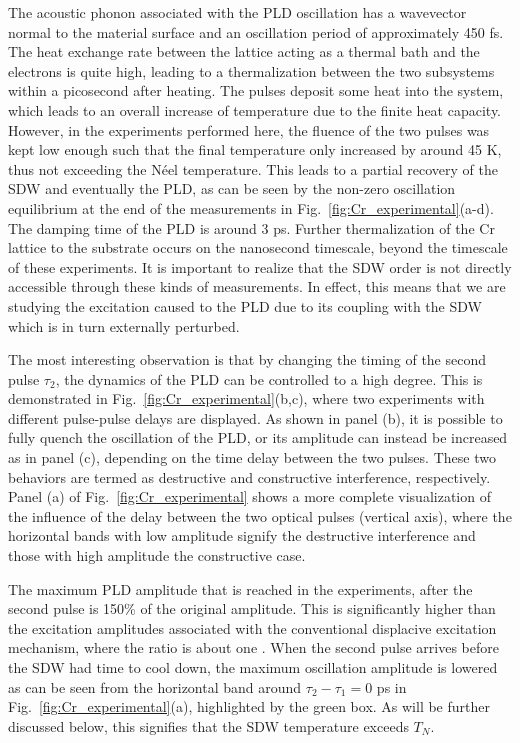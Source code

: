 The acoustic phonon associated with the PLD oscillation has a wavevector normal to the material surface and an oscillation period of approximately 450 fs.
The heat exchange rate between the lattice acting as a thermal bath and the electrons is quite high, leading to a thermalization between the two subsystems within a picosecond after heating.
The pulses deposit some heat into the system, which leads to an overall increase of temperature due to the finite heat capacity.
However, in the experiments performed here, the fluence of the two pulses was kept low enough such that the final temperature only increased by around 45 K, thus not exceeding the N\'eel temperature.
This leads to a partial recovery of the SDW and eventually the PLD, as can be seen by the non-zero oscillation equilibrium at the end of the measurements in Fig.~\ref{fig:Cr_experimental}(a-d).
The damping time of the PLD is around 3 ps.
Further thermalization of the Cr lattice to the substrate occurs on the nanosecond timescale, beyond the timescale of these experiments.
It is important to realize that the SDW order is not directly accessible through these kinds of measurements. In effect, this means that we are studying the excitation caused to the PLD due to its coupling with the SDW which is in turn externally perturbed.

The most interesting observation is that by changing the timing of the second pulse $\tau_2$, the dynamics of the PLD can be controlled to a high degree.
This is demonstrated in Fig.~\ref{fig:Cr_experimental}(b,c), where two experiments with different pulse-pulse delays are displayed.
As shown in panel (b), it is possible to fully quench the oscillation of the PLD, or its amplitude can instead be increased as in panel (c), depending on the time delay between the two pulses.
These two behaviors are termed as destructive and constructive interference, respectively.
Panel (a) of Fig.~\ref{fig:Cr_experimental} shows a more complete visualization of the influence of the delay between the two optical pulses (vertical axis), where the horizontal bands with low amplitude signify the destructive interference and those with high amplitude the constructive case.

The maximum PLD amplitude that is reached in the experiments, after the second pulse is 150\% of the original amplitude.
This is significantly higher than the excitation amplitudes associated with the conventional displacive excitation mechanism, where the ratio is about one \cite{Singer2015prl,Zeiger1992}. 
When the second pulse arrives before the SDW had time to cool down, the maximum oscillation amplitude is lowered as can be seen from the horizontal band around $\tau_2 - \tau_1 = 0$ ps in Fig.~\ref{fig:Cr_experimental}(a), highlighted by the green box.
As will be further discussed below, this signifies that the SDW temperature exceeds $T_N$.

